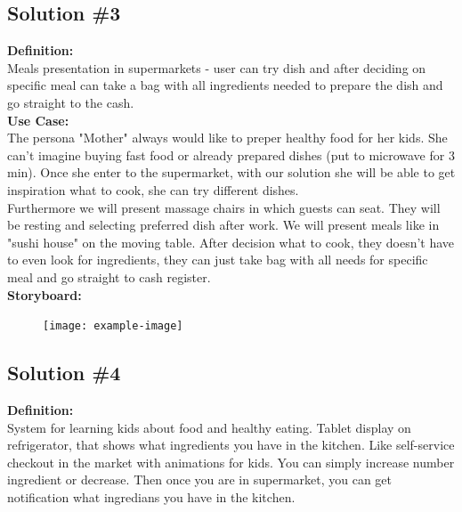 \documentclass[a4paper,10pt,oneside]{scrreprt}
\begin{document}
		\clearpage

		\subsection{Solution \#3}

		\noindent \textbf{Definition:}\\
			Meals presentation in supermarkets - user can try dish and after deciding on specific meal can take a bag with all ingredients needed to prepare the dish and go straight to the cash.\\

			\noindent \textbf{Use Case:}\\
			The persona "Mother" always would like to preper healthy food for her kids. She can't imagine buying fast food or
already prepared dishes (put to microwave for 3 min). Once she enter to the supermarket, with our solution she will
be able to get inspiration what to cook, she can try different dishes.\\

			Furthermore we will present massage chairs in which guests can seat. They will be resting and selecting preferred dish after work. We will present meals like in "sushi house" on the moving table. After decision what to cook, they doesn't have to
even look for ingredients, they can just take bag with all needs for specific meal and go straight to cash register.\\

			\noindent \textbf{Storyboard:}\\

			\begin{figure}[H]
				\centering
				\texttt{[image: example-image]}
			\end{figure}

		\subsection{Solution \#4}

		\noindent \textbf{Definition:}\\
			System for learning kids about food and healthy eating. Tablet display on refrigerator, that shows what ingredients you have in the kitchen. Like self-service checkout in the market with animations for kids. You can simply increase number ingredient or decrease. Then once you are in supermarket, you can get notification what ingredians you have in the kitchen.\\
\end{document}
